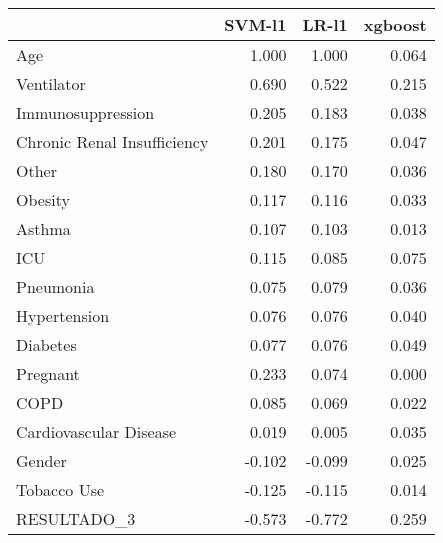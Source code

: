 \begin{tabular}{lrrr}
\toprule
{} &  SVM-l1 &  LR-l1 &  xgboost \\
\midrule
Age                         &   1.000 &  1.000 &    0.064 \\
Ventilator                  &   0.690 &  0.522 &    0.215 \\
Immunosuppression           &   0.205 &  0.183 &    0.038 \\
Chronic Renal Insufficiency &   0.201 &  0.175 &    0.047 \\
Other                       &   0.180 &  0.170 &    0.036 \\
Obesity                     &   0.117 &  0.116 &    0.033 \\
Asthma                      &   0.107 &  0.103 &    0.013 \\
ICU                         &   0.115 &  0.085 &    0.075 \\
Pneumonia                   &   0.075 &  0.079 &    0.036 \\
Hypertension                &   0.076 &  0.076 &    0.040 \\
Diabetes                    &   0.077 &  0.076 &    0.049 \\
Pregnant                    &   0.233 &  0.074 &    0.000 \\
COPD                        &   0.085 &  0.069 &    0.022 \\
Cardiovascular Disease      &   0.019 &  0.005 &    0.035 \\
Gender                      &  -0.102 & -0.099 &    0.025 \\
Tobacco Use                 &  -0.125 & -0.115 &    0.014 \\
RESULTADO\_3                 &  -0.573 & -0.772 &    0.259 \\
\bottomrule
\end{tabular}
